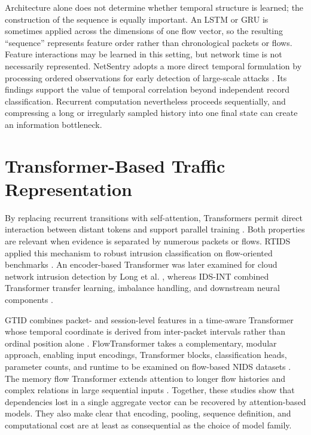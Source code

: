 \documentclass[11pt,fleqn]{report}
\begin{document}
Architecture alone does not determine whether temporal structure is learned; the construction of the sequence is equally important. An LSTM or GRU is sometimes applied across the dimensions of one flow vector, so the resulting ``sequence'' represents feature order rather than chronological packets or flows. Feature interactions may be learned in this setting, but network time is not necessarily represented. NetSentry adopts a more direct temporal formulation by processing ordered observations for early detection of large-scale attacks \cite{LiuPatras2022NetSentry}. Its findings support the value of temporal correlation beyond independent record classification. Recurrent computation nevertheless proceeds sequentially, and compressing a long or irregularly sampled history into one final state can create an information bottleneck.

\section{Transformer-Based Traffic Representation}
\label{subsec:rw_transformers}

By replacing recurrent transitions with self-attention, Transformers permit direct interaction between distant tokens and support parallel training \cite{Vaswani2017}. Both properties are relevant when evidence is separated by numerous packets or flows. RTIDS applied this mechanism to robust intrusion classification on flow-oriented benchmarks \cite{Wu2022RTIDS}. An encoder-based Transformer was later examined for cloud network intrusion detection by Long et al. \cite{Long2024TransformerNIDS}, whereas IDS-INT combined Transformer transfer learning, imbalance handling, and downstream neural components \cite{Ullah2024IDSINT}.

GTID combines packet- and session-level features in a time-aware Transformer whose temporal coordinate is derived from inter-packet intervals rather than ordinal position alone \cite{Han2023GTID}. FlowTransformer takes a complementary, modular approach, enabling input encodings, Transformer blocks, classification heads, parameter counts, and runtime to be examined on flow-based NIDS datasets \cite{Manocchio2024FlowTransformer}. The memory flow Transformer extends attention to longer flow histories and complex relations in large sequential inputs \cite{Jiang2025MFT}. Together, these studies show that dependencies lost in a single aggregate vector can be recovered by attention-based models. They also make clear that encoding, pooling, sequence definition, and computational cost are at least as consequential as the choice of model family.
\end{document}
